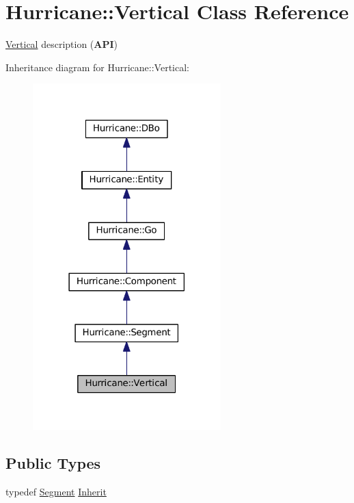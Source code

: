 \hypertarget{classHurricane_1_1Vertical}{}\section{Hurricane\+:\+:Vertical Class Reference}
\label{classHurricane_1_1Vertical}


\mbox{\hyperlink{classHurricane_1_1Vertical}{Vertical}} description ({\bfseries A\+PI})  




Inheritance diagram for Hurricane\+:\+:Vertical\+:\nopagebreak
\begin{figure}[H]
\begin{center}
\leavevmode
\includegraphics[width=206pt]{classHurricane_1_1Vertical__inherit__graph}
\end{center}
\end{figure}
\subsection*{Public Types}
\begin{DoxyCompactItemize}
\item 
typedef \mbox{\hyperlink{classHurricane_1_1Segment}{Segment}} \mbox{\hyperlink{classHurricane_1_1Vertical_a0132a4151899b356b157562c792294fd}{Inherit}}
\end{DoxyCompactItemize}
